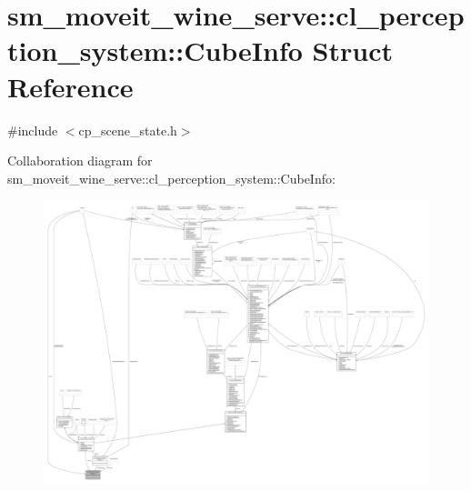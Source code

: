 \hypertarget{structsm__moveit__wine__serve_1_1cl__perception__system_1_1CubeInfo}{}\section{sm\+\_\+moveit\+\_\+wine\+\_\+serve\+:\+:cl\+\_\+perception\+\_\+system\+:\+:Cube\+Info Struct Reference}
\label{structsm__moveit__wine__serve_1_1cl__perception__system_1_1CubeInfo}


{\ttfamily \#include $<$cp\+\_\+scene\+\_\+state.\+h$>$}



Collaboration diagram for sm\+\_\+moveit\+\_\+wine\+\_\+serve\+:\+:cl\+\_\+perception\+\_\+system\+:\+:Cube\+Info\+:
\nopagebreak
\begin{figure}[H]
\begin{center}
\leavevmode
\includegraphics[width=350pt]{structsm__moveit__wine__serve_1_1cl__perception__system_1_1CubeInfo__coll__graph}
\end{center}
\end{figure}
